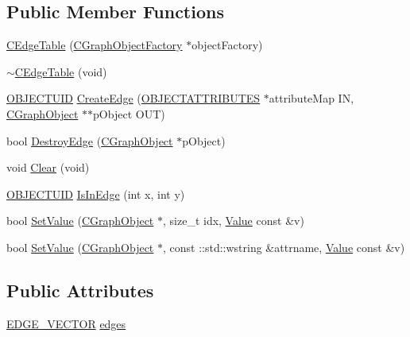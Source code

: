 \subsection*{Public Member Functions}
\begin{DoxyCompactItemize}
\item 
\hyperlink{class_n_m_1_1_o_d_b_1_1_c_edge_table_a6f43fd9cd4bbdb2a70652059195e94f3}{C\+Edge\+Table} (\hyperlink{class_n_m_1_1_o_d_b_1_1_c_graph_object_factory}{C\+Graph\+Object\+Factory} $\ast$object\+Factory)
\item 
\hyperlink{class_n_m_1_1_o_d_b_1_1_c_edge_table_ab18a394e7956aba0a7791c8306a0da7d}{$\sim$\+C\+Edge\+Table} (void)
\item 
\hyperlink{namespace_n_m_1_1_o_d_b_a262b64fab56baaa96e18bac4ada88265}{O\+B\+J\+E\+C\+T\+U\+I\+D} \hyperlink{class_n_m_1_1_o_d_b_1_1_c_edge_table_ada23e934605fb03751af8c8f0d103586}{Create\+Edge} (\hyperlink{namespace_n_m_1_1_o_d_b_a8770283da9792324e1afe8104d40123b}{O\+B\+J\+E\+C\+T\+A\+T\+T\+R\+I\+B\+U\+T\+E\+S} $\ast$attribute\+Map I\+N, \hyperlink{class_n_m_1_1_o_d_b_1_1_c_graph_object}{C\+Graph\+Object} $\ast$$\ast$p\+Object O\+U\+T)
\item 
bool \hyperlink{class_n_m_1_1_o_d_b_1_1_c_edge_table_a0f87540d83e5e271b03bef2923c7ee24}{Destroy\+Edge} (\hyperlink{class_n_m_1_1_o_d_b_1_1_c_graph_object}{C\+Graph\+Object} $\ast$p\+Object)
\item 
void \hyperlink{class_n_m_1_1_o_d_b_1_1_c_edge_table_a8415e1e3d9b141b70b1f070da70496f4}{Clear} (void)
\item 
\hyperlink{namespace_n_m_1_1_o_d_b_a262b64fab56baaa96e18bac4ada88265}{O\+B\+J\+E\+C\+T\+U\+I\+D} \hyperlink{class_n_m_1_1_o_d_b_1_1_c_edge_table_a5a6d28ed886386af18efec130eb0307c}{Is\+In\+Edge} (int x, int y)
\item 
bool \hyperlink{class_n_m_1_1_o_d_b_1_1_c_edge_table_a67f722668bfebd46ac05288e20523003}{Set\+Value} (\hyperlink{class_n_m_1_1_o_d_b_1_1_c_graph_object}{C\+Graph\+Object} $\ast$, size\+\_\+t idx, \hyperlink{class_n_m_1_1_o_d_b_1_1_value}{Value} const \&v)
\item 
bool \hyperlink{class_n_m_1_1_o_d_b_1_1_c_edge_table_ad210f2bbf1ba2c9e3a314814a8c1df9e}{Set\+Value} (\hyperlink{class_n_m_1_1_o_d_b_1_1_c_graph_object}{C\+Graph\+Object} $\ast$, const \+::std\+::wstring \&attrname, \hyperlink{class_n_m_1_1_o_d_b_1_1_value}{Value} const \&v)
\end{DoxyCompactItemize}
\subsection*{Public Attributes}
\begin{DoxyCompactItemize}
\item 
\hyperlink{class_n_m_1_1_o_d_b_1_1_c_edge_table_acb09088dea6dd356999095d7c7cb977a}{E\+D\+G\+E\+\_\+\+V\+E\+C\+T\+O\+R} \hyperlink{class_n_m_1_1_o_d_b_1_1_c_edge_table_a13626344aef11255b5c5e3538613854f}{edges}
\end{DoxyCompactItemize}
